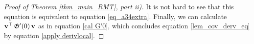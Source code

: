 \begin{proof}[Proof of Theorem \ref{thm_main_RMT}, part ii)]
It is not hard to see that this equation is equivalent to equation \eqref{eq_a34extra}. 
Finally, we can calculate $\operatorname{\mathbf{v}}^\top {\mathfrak G}'(0)\operatorname{\mathbf{v}}$ as in equation \eqref{cal G'0}, which concludes equation \ref{lem_cov_derv_eq} by equation \eqref{apply derivlocal}.  
\end{proof}


